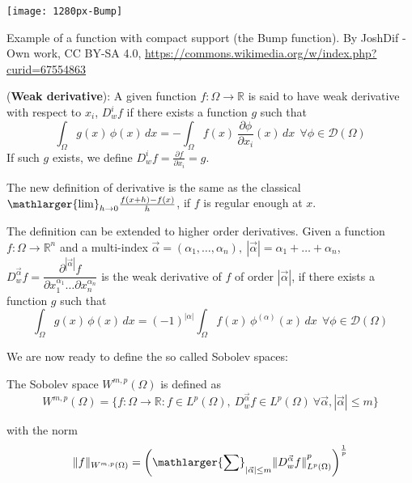 \begin{marginfigure}[-4.0cm]
	\texttt{[image: 1280px-Bump]}
	\caption[]{Example of a function with compact support (the Bump function). By JoshDif - Own work, CC BY-SA 4.0,
        \url{https://commons.wikimedia.org/w/index.php?curid=67554863}} 
\end{marginfigure}

\begin{definition}
(\textbf{Weak derivative}): A given function $f : \Omega \rightarrow \mathbb{R}$
is said to have weak derivative with respect to $x_i$,
$D_w^if$ if there exists a function $g$
such that
\begin{equation}
\int_{\Omega}{g(x)\, \phi(x)}\,dx =
-\int_{\Omega}{f(x) \, \frac{\partial{\phi}}{\partial{x}_i}(x)}\,dx~~\forall \phi \in \mathcal{D}(\Omega)
\end{equation}
If such $g$ exists, we define $D^i_wf = \frac{\partial{f}}{\partial{x}_i} = g$.
\end{definition}
The new definition of derivative is the same as the classical
$\mathlarger{\lim}_{h\rightarrow 0} \frac{f(x+h) - f(x)}{h}$,
if $f$ is regular enough at $x$.

\medskip

The definition can be extended to higher order derivatives.
Given a function $f: \Omega \rightarrow \mathbb{R}^n$ and
a multi-index $\vec{\alpha} = (\alpha_1,\dots,\alpha_n),
~|\vec{\alpha}| = \alpha_1 + \dots + \alpha_n$,
$D_w^{\vec{\alpha}}f = \dfrac{\partial^{|\vec{\alpha}|}{f}}{\partial{x_1^{\alpha_1}}\dots\partial{x_n^{\alpha_n}}}$
is the weak derivative of $f$ of order $|\vec{\alpha}|$,
if there exists a function $g$ such that
\begin{equation}
\int_{\Omega}{g(x)\, \phi(x)}\,dx =
(-1)^{|\alpha|}\int_{\Omega}{f(x) \, {\phi}^{(\alpha)}(x)}\,dx~~\forall \phi \in \mathcal{D}(\Omega)
\end{equation}

We are now ready to define the so called Sobolev spaces:
\begin{definition} 
The Sobolev space $W^{m,p}(\Omega)$ is defined as
\begin{equation}
W^{m,p}(\Omega) = \{f:\Omega\rightarrow \mathbb{R} : f \in L^{p}(\Omega),~D_w^{\vec{\alpha}}f \in L^{p}(\Omega)~ \forall \vec{\alpha},
|\vec{\alpha}| \le m  \}
\end{equation}
\end{definition}
with the norm
\begin{equation}
\lVert f \rVert_{W^{m,p}(\Omega)} = \left ( \mathlarger{\sum}_{|\vec{\alpha}| \le m}{\lVert D_w^{\vec{\alpha}} f \rVert}^p_{L^{p}(\Omega)} \right )^{\frac{1}{p}} \labeq{Wmpnorm}
\end{equation}

